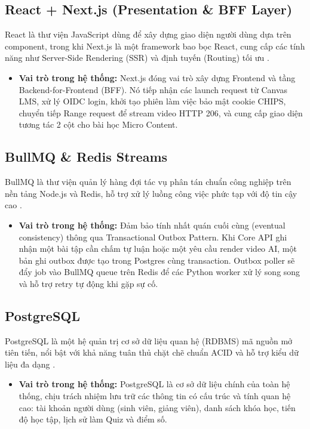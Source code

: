 \subsection{React + Next.js (Presentation \& BFF Layer)}
React là thư viện JavaScript dùng để xây dựng giao diện người dùng dựa trên component, trong khi Next.js là một framework bao bọc React, cung cấp các tính năng như Server-Side Rendering (SSR) và định tuyến (Routing) tối ưu \cite{vercel2024nextjs}.
\begin{itemize}
    \item \textbf{Vai trò trong hệ thống:} Next.js đóng vai trò xây dựng Frontend và tầng Backend-for-Frontend (BFF). Nó tiếp nhận các launch request từ Canvas LMS, xử lý OIDC login, khởi tạo phiên làm việc bảo mật cookie CHIPS, chuyển tiếp Range request để stream video HTTP 206, và cung cấp giao diện tương tác 2 cột cho bài học Micro Content.
\end{itemize}

\subsection{BullMQ \& Redis Streams}
BullMQ là thư viện quản lý hàng đợi tác vụ phân tán chuẩn công nghiệp trên nền tảng Node.js và Redis, hỗ trợ xử lý luồng công việc phức tạp với độ tin cậy cao \cite{bullmq2024}.
\begin{itemize}
    \item \textbf{Vai trò trong hệ thống:} Đảm bảo tính nhất quán cuối cùng (eventual consistency) thông qua Transactional Outbox Pattern. Khi Core API ghi nhận một bài tập cần chấm tự luận hoặc một yêu cầu render video AI, một bản ghi outbox được tạo trong Postgres cùng transaction. Outbox poller sẽ đẩy job vào BullMQ queue trên Redis để các Python worker xử lý song song và hỗ trợ retry tự động khi gặp sự cố.
\end{itemize}

\subsection{PostgreSQL}
PostgreSQL là một hệ quản trị cơ sở dữ liệu quan hệ (RDBMS) mã nguồn mở tiên tiến, nổi bật với khả năng tuân thủ chặt chẽ chuẩn ACID và hỗ trợ kiểu dữ liệu đa dạng \cite{postgresql2024}.
\begin{itemize}
    \item \textbf{Vai trò trong hệ thống:} PostgreSQL là cơ sở dữ liệu chính của toàn hệ thống, chịu trách nhiệm lưu trữ các thông tin có cấu trúc và tính quan hệ cao: tài khoản người dùng (sinh viên, giảng viên), danh sách khóa học, tiến độ học tập, lịch sử làm Quiz và điểm số.
\end{itemize}

